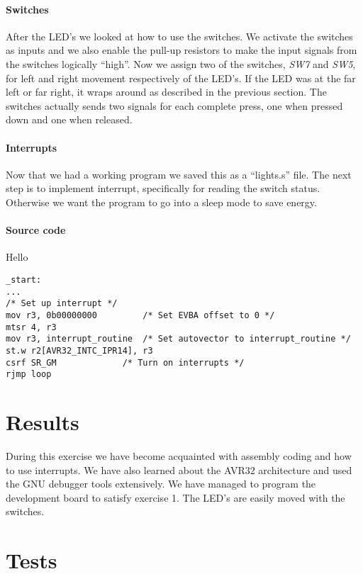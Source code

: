 \documentclass[a4paper,11pt]{article}
\begin{document}
\paragraph{Switches}
After the LED's we looked at how to use the switches. We activate the switches as inputs and we also enable the pull-up resistors to make the input signals from the switches logically “high”. Now we assign two of the switches, \emph{SW7} and \emph{SW5}, for left and right movement respectively of the LED’s. If the LED was at the far left or far right, it wraps around as described in the previous section. The switches actually sends two signals for each complete press, one when pressed down and one when released.  

\paragraph{Interrupts}
Now that we had a working program we saved this as a “lights.s” file. The next step is to implement interrupt, specifically for reading the switch status. Otherwise we want the program to go into a sleep mode to save energy. 

\paragraph{Source code}
Hello

\begin{lstlisting}
_start:
...
/* Set up interrupt */
mov r3, 0b00000000  	   /* Set EVBA offset to 0 */
mtsr 4, r3			
mov r3, interrupt_routine  /* Set autovector to interrupt_routine */
st.w r2[AVR32_INTC_IPR14], r3	
csrf SR_GM  		   /* Turn on interrupts */
rjmp loop
\end{lstlisting}

\section{Results}
During this exercise we have become acquainted with assembly coding and how to use interrupts. We have also learned about the AVR32 architecture and used the GNU debugger tools extensively. We have managed to program the development board to satisfy exercise 1. The LED's are easily moved with the switches.

\section{Tests}
\end{document}
